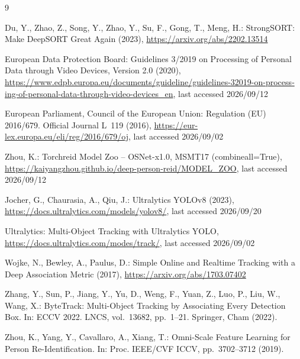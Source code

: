 \documentclass[runningheads,a4paper]{llncs}
\begin{document}
\begin{otherlanguage}{english}
\renewcommand{\refname}{Literatur}
\footnotesize
\begin{thebibliography}{9}
\setlength{\itemsep}{0pt}
\setlength{\parsep}{0pt}

Du, Y., Zhao, Z., Song, Y., Zhao, Y., Su, F., Gong, T., Meng, H.: StrongSORT: Make DeepSORT Great Again (2023), \url{https://arxiv.org/abs/2202.13514}

European Data Protection Board: Guidelines 3/2019 on Processing of Personal Data through Video Devices, Version 2.0 (2020), \url{https://www.edpb.europa.eu/documents/guideline/guidelines-32019-on-processing-of-personal-data-through-video-devices_en}, last accessed 2026/09/12

European Parliament, Council of the European Union: Regulation (EU) 2016/679. Official Journal L~119 (2016), \url{https://eur-lex.europa.eu/eli/reg/2016/679/oj}, last accessed 2026/09/02

Zhou, K.: Torchreid Model Zoo -- OSNet-x1.0, MSMT17 (combineall=True), \url{https://kaiyangzhou.github.io/deep-person-reid/MODEL_ZOO}, last accessed 2026/09/12

Jocher, G., Chaurasia, A., Qiu, J.: Ultralytics YOLOv8 (2023), \url{https://docs.ultralytics.com/models/yolov8/}, last accessed 2026/09/20

Ultralytics: Multi-Object Tracking with Ultralytics YOLO, \url{https://docs.ultralytics.com/modes/track/}, last accessed 2026/09/02

Wojke, N., Bewley, A., Paulus, D.: Simple Online and Realtime Tracking with a Deep Association Metric (2017), \url{https://arxiv.org/abs/1703.07402}

Zhang, Y., Sun, P., Jiang, Y., Yu, D., Weng, F., Yuan, Z., Luo, P., Liu, W., Wang, X.: ByteTrack: Multi-Object Tracking by Associating Every Detection Box. In: ECCV 2022. LNCS, vol.~13682, pp.~1--21. Springer, Cham (2022). 

Zhou, K., Yang, Y., Cavallaro, A., Xiang, T.: Omni-Scale Feature Learning for Person Re-Identification. In: Proc. IEEE/CVF ICCV, pp.~3702--3712 (2019). 

\end{thebibliography}
\end{otherlanguage}
\end{document}
